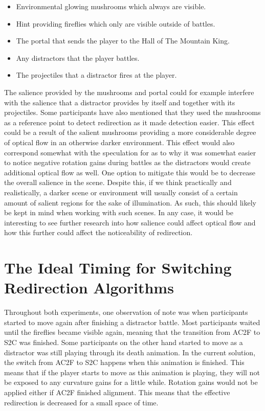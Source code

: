\begin{itemize}
    \item Environmental glowing mushrooms which always are visible.
    \item Hint providing fireflies which only are visible outside of battles.
    \item The portal that sends the player to the Hall of The Mountain King. 
    \item Any distractors that the player battles.
    \item The projectiles that a distractor fires at the player. 
\end{itemize}

The salience provided by the mushrooms and portal could for example interfere with the salience that a distractor provides by itself and together with its projectiles. Some participants have also mentioned that they used the mushrooms as a reference point to detect redirection as it made detection easier. This effect could be a result of the salient mushrooms providing a more considerable degree of optical flow in an otherwise darker environment. This effect would also correspond somewhat with the speculation for as to why it was somewhat easier to notice negative rotation gains during battles as the distractors would create additional optical flow as well. One option to mitigate this would be to decrease the overall salience in the scene. Despite this, if we think practically and realistically, a darker scene or environment will usually consist of a certain amount of salient regions for the sake of illumination. As such, this should likely be kept in mind when working with such scenes. In any case, it would be interesting to see further research into how salience could affect optical flow and how this further could affect the noticeability of redirection.

\section{The Ideal Timing for Switching Redirection Algorithms}\label{sec:idealAlgorithmTimingSwitch}
Throughout both experiments, one observation of note was when participants started to move again after finishing a distractor battle. Most participants waited until the fireflies became visible again, meaning that the transition from AC2F to S2C was finished. Some participants on the other hand started to move as a distractor was still playing through its death animation. In the current solution, the switch from AC2F to S2C happens when this animation is finished. This means that if the player starts to move as this animation is playing, they will not be exposed to any curvature gains for a little while. Rotation gains would not be applied either if AC2F finished alignment. This means that the effective redirection is decreased for a small space of time. 

